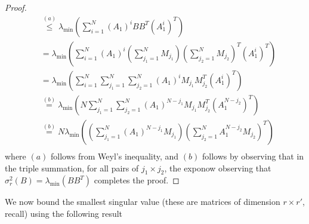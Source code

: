 \documentclass[10pt]{article}
\newtheorem{theorem}{Theorem}
\begin{document}
{\begin{proof}
\begin{align*}
&\overset{(a)}{\leq}  \lambda_{\min}\left( \sum_{i=1}^N (A_1)^i B B^T (A_1^i)^T \right) \\
&= \lambda_{\min}\left( \sum_{i=1}^N (A_1)^i  \left(\sum_{j_1=1}^N M_{j_1} \right)  \left(\sum_{j_2=1}^N M_{j_2} \right)^T (A_1^i)^T \right) \\
&= \lambda_{\min}\left( \sum_{i=1}^N \sum_{j_1=1}^N \sum_{j_2=1}^N (A_1)^i  M_{j_1} M_{j_2}^T (A_1^i)^T \right) \\
&\overset{(b)}{=} \lambda_{\min} \left( N \sum_{j_1=1}^N \sum_{j_2=1}^N (A_1)^{N - j_1}  M_{j_1} M_{j_2}^T (A_1^{N - j_2})^T 
 \right) \\
&\overset{(b)}{=} N \lambda_{\min}\left( \left(\sum_{j_1=1}^N  (A_1)^{N - j_1}  M_{j_1} \right) \left( \sum_{j_2=1}^N A_1^{N - j_2} M_{j_2} \right)^T \right) \\
\end{align*}
where $(a)$ follows from Weyl's inequality, and $(b)$ follows by observing that in the triple summation, for all pairs of $j_1 \times j_2$, the exponow observing that $\sigma_r^2(B) = \lambda_{\min}(B B^T)$ completes the proof.
\end{proof}
}


We now bound the smallest singular value (these are matrices of dimension $r \times r'$, recall) using the following result 
\cite[Theorem 1.1]{smallest_rect}
\end{document}
